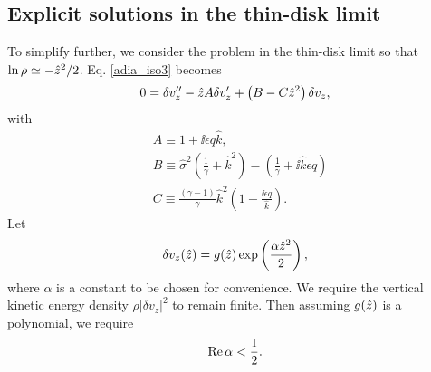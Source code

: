 \subsection{Explicit solutions in the thin-disk limit}
To simplify further, we consider the problem in the thin-disk limit so
that $\ln \rho \simeq -\hat{z}^2/2$. Eq. \ref{adia_iso3} becomes 
\begin{align}
  0 = \delta v_z^{\prime\prime} - \hat{z} A \delta v_z^\prime + \left(B
    - C \hat{z}^2\right)\delta v_z,
\end{align}
with
\begin{align}
  &A \equiv 1 + \ii \epsilon q \hat{k},\\
  &B \equiv \hat{\sigma}^2\left(\frac{1}{\gamma} + \hat{k}^2\right) -
  \left(\frac{1}{\gamma} + \ii \hat{k} \epsilon q\right)\\
  &C \equiv \frac{\left(\gamma-1\right)}{\gamma}\hat{k}^2\left(1 - \frac{\ii
      \epsilon q}{\hat{k}}\right).\label{adia_thin}
\end{align}
Let
\begin{align}
  \delta v_z(\hat{z}) =
  g(\hat{z})\exp\left(\frac{\alpha\hat{z}^2}{2}\right), \label{adia_ansatz}
\end{align}
where $\alpha$ is a constant to be chosen for convenience. We require
the vertical kinetic energy density $\rho|\delta v_z|^2$ to remain
finite.  Then assuming
$g(\hat{z})$ is a polynomial, we require 
\begin{align}
  \operatorname{Re}\alpha < \frac{1}{2}. 
\end{align}

